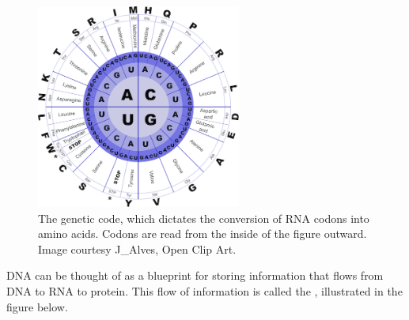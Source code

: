 \begin{figure}[h]
\centering
\mySfFamily
\includegraphics[width = 0.6\textwidth]{../assets/images/600px/genetic_code.png}
\caption{The genetic code, which dictates the conversion of RNA codons into amino acids. Codons are read from the inside of the figure outward. Image courtesy J_Alves, Open Clip Art.}
\label{fig:genetic_code}
\end{figure}

DNA can be thought of as a blueprint for storing information that flows from DNA to RNA to protein. This flow of information is called the , illustrated in the figure below.

\begin{note}\end{note}

